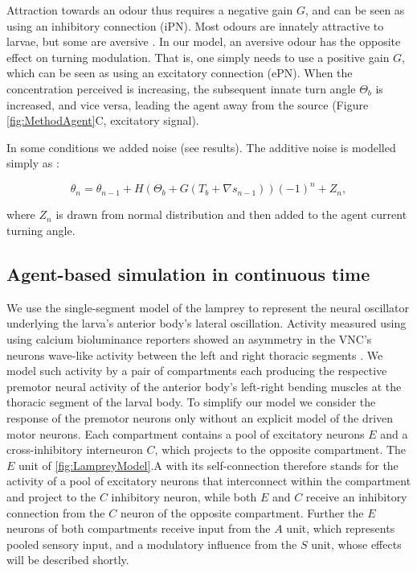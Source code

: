 \documentclass[11pt,a4paper]{article}
\begin{document}
Attraction towards an odour thus requires a negative  gain $G$, and can be seen as using an inhibitory connection (iPN).  Most odours are innately attractive to larvae, but some are aversive \citep{hallem2006coding}. In our model, an aversive odour has the opposite effect on turning modulation. That is, one simply needs to use a positive gain $G$, which can be seen as using an excitatory connection (ePN). When the concentration perceived is increasing, the subsequent innate turn angle $\Theta_b$ is increased, and vice versa, leading the agent away from the source (Figure \ref{fig:MethodAgent}C, excitatory signal).

In some conditions we added noise (see results). The additive noise is modelled simply as :

\begin{equation}
\theta_n = \theta_{n-1} + H(\Theta_b + G (T_b + \nabla s_{n-1})){(-1)}^n + Z_n,
\end{equation}

where $Z_n$ is drawn from normal distribution and then added to the agent current turning angle. 
 
\subsection{Agent-based simulation in continuous time}
\label{sec:methodsCoupledOscillator}
We use the single-segment model of the lamprey \citep{lansner1997realistic} to represent the neural oscillator underlying the larva's anterior body's lateral oscillation. Activity measured using using calcium bioluminance reporters  showed an asymmetry in the VNC's neurons wave-like activity between the left and right thoracic segments \citep{berni2015genetic}. We model such activity by a pair of compartments each producing the respective premotor neural activity of the anterior  body's left-right bending muscles at the thoracic segment of the larval body. To simplify our model we consider the response of the premotor neurons only without an explicit model of the driven motor neurons. Each compartment contains a pool of excitatory neurons $E$ and a cross-inhibitory interneuron $C$, which projects to the opposite compartment. The $E$ unit of \ref{fig:LampreyModel}.A with its self-connection therefore stands for the activity of a pool of excitatory neurons that interconnect within the compartment and project to the $C$ inhibitory neuron, while both  $E$ and $C$ receive an inhibitory connection from the $C$ neuron of the opposite compartment. Further the $E$ neurons of both compartments receive input from the $A$ unit, which represents pooled sensory input, and a modulatory influence from the $S$ unit, whose effects will be described shortly.
\end{document}

